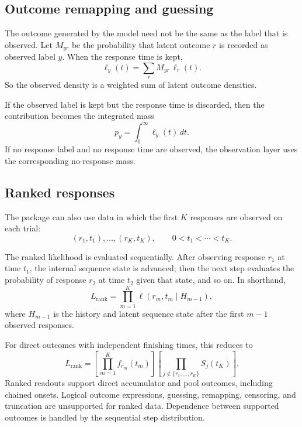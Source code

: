 \documentclass[11pt]{article}
\begin{document}
\subsection{Outcome remapping and guessing}

The outcome generated by the model need not be the same as the label that is
observed. Let $M_{yr}$ be the probability that latent outcome $r$ is recorded
as observed label $y$. When the response time is kept,
\begin{equation}
\ell_y(t) = \sum_r M_{yr}\,\ell_r(t).
\label{eq:remap}
\end{equation}
So the observed density is a weighted sum of latent outcome densities.

If the observed label is kept but the response time is discarded, then the
contribution becomes the integrated mass
\begin{equation}
p_y = \int_0^\infty \ell_y(t)\,dt.
\label{eq:missing-rt}
\end{equation}
If no response label and no response time are observed, the observation layer
uses the corresponding no-response mass.

\subsection{Ranked responses}

The package can also use data in which the first $K$ responses are observed on
each trial:
\[
(r_1,t_1),\dots,(r_K,t_K),
\qquad
0 < t_1 < \cdots < t_K.
\]

The ranked likelihood is evaluated sequentially. After observing response
$r_1$ at time $t_1$, the internal sequence state is advanced; then the next
step evaluates the probability of response $r_2$ at time $t_2$ given that
state, and so on. In shorthand,
\begin{equation}
L_{\mathrm{rank}}
=
\prod_{m=1}^K
\ell\!\left(r_m,t_m \mid H_{m-1}\right),
\label{eq:rank-general}
\end{equation}
where $H_{m-1}$ is the history and latent sequence state after the first
$m-1$ observed responses.

For direct outcomes with independent finishing times, this reduces to
\begin{equation}
L_{\mathrm{rank}}
=
\left[\prod_{m=1}^K f_{r_m}(t_m)\right]
\left[\prod_{j \notin \{r_1,\dots,r_K\}} S_j(t_K)\right].
\label{eq:rank-simple}
\end{equation}
Ranked readouts support direct accumulator and pool outcomes, including chained
onsets. Logical outcome expressions, guessing, remapping, censoring, and
truncation are unsupported for ranked data. Dependence between supported
outcomes is handled by the sequential step distribution.
\end{document}
